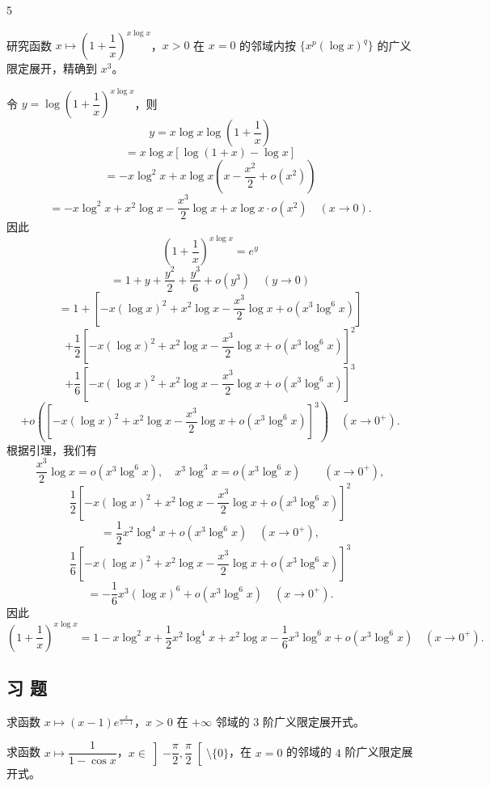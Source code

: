 \begin{sourceexample}{5}

研究函数 $x\longmapsto\left(1+\dfrac{1}{x}\right)^{x\log x}$，$x>0$ 在 $x=0$ 的邻域内按 $\{x^p(\log x)^q\}$ 的广义限定展开，精确到 $x^3$。

令 $y=\log\left(1+\dfrac{1}{x}\right)^{x\log x}$，则
\[y=x\log x\log\left(1+\frac{1}{x}\right)\]
\[=x\log x[\log(1+x)-\log x]\]
\[=-x\log^2x+x\log x\left(x-\frac{x^2}{2}+o(x^2)\right)\]\[=-x\log^2x+x^2\log x-\frac{x^3}{2}\log x+x\log x\cdot o(x^2)\quad(x\to0).\]
因此
\[\left(1+\frac{1}{x}\right)^{x\log x}=e^{y}\]
\[=1+y+\frac{y^{2}}{2}+\frac{y^{3}}{6}+o(y^{3})\quad(y\to0)\]
\[=1+\left[-x(\log x)^{2}+x^{2}\log x-\frac{x^{3}}{2}\log x+o(x^{3}\log^{6}x)\right]\]
\[+\frac{1}{2}\left[-x(\log x)^{2}+x^{2}\log x-\frac{x^{3}}{2}\log x+o(x^{3}\log^{6}x)\right]^{2}\]
\[+\frac{1}{6}\left[-x(\log x)^{2}+x^{2}\log x-\frac{x^{3}}{2}\log x+o(x^{3}\log^{6}x)\right]^{3}\]
\[+o\left(\left[-x(\log x)^{2}+x^{2}\log x-\frac{x^{3}}{2}\log x+o(x^{3}\log^{6}x)\right]^{3}\right)\quad(x\to0^{+}).\]
根据引理，我们有
\[\frac{x^3}{2}\log x=o(x^3\log^6x),\quad x^3\log^3x=o(x^3\log^6x)\qquad(x\to0^+),\]
\[\frac{1}{2}\left[-x(\log x)^2+x^2\log x-\frac{x^3}{2}\log x+o(x^3\log^6x)\right]^2\]
\[=\frac{1}{2}x^2\log^4x+o(x^3\log^6x)\quad(x\to0^+),\]
\[\frac{1}{6}\left[-x(\log x)^2+x^2\log x-\frac{x^3}{2}\log x+o(x^3\log^6x)\right]^3\]
\[=-\frac{1}{6}x^3(\log x)^6+o(x^3\log^6x)\quad(x\to0^+).\]
因此
\[\left(1+\frac{1}{x}\right)^{x\log x}=1-x\log^{2}x+\frac{1}{2}x^{2}\log^{4}x+x^{2}\log x-\frac{1}{6}x^{3}\log^{6}x+o(x^{3}\log^{6}x)\quad(x\to0^{+}).\]

\end{sourceexample}

\subsection*{习 题}

\begin{exercise}
	\item 求函数 $x\longmapsto(x-1)e^{\frac{x}{x-1}}$，$x>0$ 在 $+\infty$ 邻域的 $3$ 阶广义限定展开式。
\end{exercise}

\begin{exercise}
	\item 求函数 $x\longmapsto\dfrac{1}{1-\cos x}$，$x\in\left]-\dfrac{\pi}{2},\dfrac{\pi}{2}\right[\setminus\{0\}$，在 $x=0$ 的邻域的 $4$ 阶广义限定展开式。
\end{exercise}

